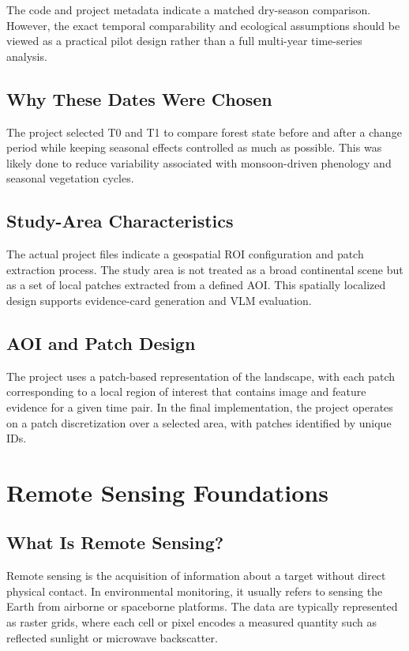 \documentclass[11pt]{article}
\begin{document}
The code and project metadata indicate a matched dry-season comparison. However, the exact temporal comparability and ecological assumptions should be viewed as a practical pilot design rather than a full multi-year time-series analysis.

\subsection{Why These Dates Were Chosen}
The project selected T0 and T1 to compare forest state before and after a change period while keeping seasonal effects controlled as much as possible. This was likely done to reduce variability associated with monsoon-driven phenology and seasonal vegetation cycles.

\subsection{Study-Area Characteristics}
The actual project files indicate a geospatial ROI configuration and patch extraction process. The study area is not treated as a broad continental scene but as a set of local patches extracted from a defined AOI. This spatially localized design supports evidence-card generation and VLM evaluation.

\subsection{AOI and Patch Design}
The project uses a patch-based representation of the landscape, with each patch corresponding to a local region of interest that contains image and feature evidence for a given time pair. In the final implementation, the project operates on a patch discretization over a selected area, with patches identified by unique IDs.


\section{Remote Sensing Foundations}

\subsection{What Is Remote Sensing?}
Remote sensing is the acquisition of information about a target without direct physical contact. In environmental monitoring, it usually refers to sensing the Earth from airborne or spaceborne platforms. The data are typically represented as raster grids, where each cell or pixel encodes a measured quantity such as reflected sunlight or microwave backscatter.
\end{document}
